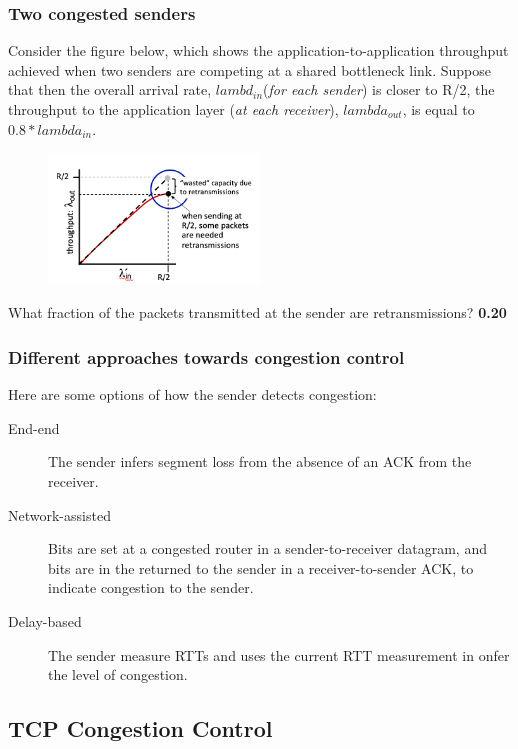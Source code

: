     \subsubsection*{Two congested senders}
    \noindent Consider the figure below, which shows the application-to-application throughput achieved when two senders are competing at a shared bottleneck link. Suppose that then the overall
    arrival rate, \( lambd_{in}\)(\textit{for each sender}) is closer to R/2, the throughput to the application layer (\textit{at each receiver}), \(lambda_{out}\), is equal to \(0.8*lambda_{in}\).
    \begin{figure}[H]
        \centering
        \includegraphics[width=0.5\textwidth]{img/3.6.2.jpg}
    \end{figure}
    \noindent What fraction of the packets transmitted at the sender are retransmissions? \textbf{0.20}

    \subsubsection*{Different approaches towards congestion control}
    \noindent Here are some options of how the sender detects congestion:
    \begin{description}
        \item[End-end] The sender infers segment loss from the absence of an ACK from the receiver.
        \item[Network-assisted] Bits are set at a congested router in a sender-to-receiver datagram, and bits are in the returned to the sender in a receiver-to-sender ACK, to indicate congestion to
        the sender.
        \item[Delay-based] The sender measure RTTs and uses the current RTT measurement in onfer the level of congestion.  
    \end{description}

\subsection*{TCP Congestion Control}

